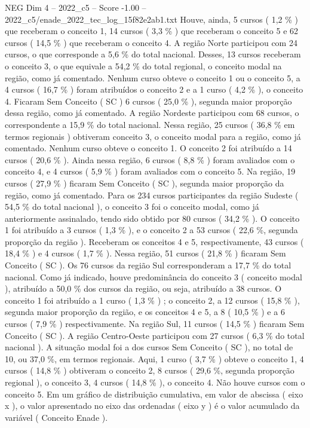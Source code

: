 \begin{textsample}{NEG Dim 4 – 2022\_c5 – Score -1.00 – 2022\_c5/enade\_2022\_tec\_log\_15f82e2ab1.txt}
Houve, ainda, 5 cursos ( 1,2 \% ) que receberam o conceito 1, 14 cursos ( 3,3 \% ) que receberam o conceito 5 e 62 cursos ( 14,5 \% ) que receberam o conceito 4.
A região Norte participou com 24 cursos, o que corresponde a 5,6 \% do total nacional.
Desses, 13 cursos receberam o conceito 3, o que equivale a 54,2 \% do total regional, o conceito modal na região, como já comentado.
Nenhum curso obteve o conceito 1 ou o conceito 5, a 4 cursos ( 16,7 \% ) foram atribuídos o conceito 2 e a 1 curso ( 4,2 \% ), o conceito 4.
Ficaram Sem Conceito ( SC ) 6 cursos ( 25,0 \% ), segunda maior proporção dessa região, como já comentado.
A região Nordeste participou com 68 cursos, o correspondente a 15,9 \% do total nacional.
Nessa região, 25 cursos ( 36,8 \% em termos regionais ) obtiveram conceito 3, o conceito modal para a região, como já comentado.
Nenhum curso obteve o conceito 1.
O conceito 2 foi atribuído a 14 cursos ( 20,6 \% ).
Ainda nessa região, 6 cursos ( 8,8 \% ) foram avaliados com o conceito 4, e 4 cursos ( 5,9 \% ) foram avaliados com o conceito 5.
Na região, 19 cursos ( 27,9 \% ) ficaram Sem Conceito ( SC ), segunda maior proporção da região, como já comentado.
Para os 234 cursos participantes da região Sudeste ( 54,5 \% do total nacional ), o conceito 3 foi o conceito modal, como já anteriormente assinalado, tendo sido obtido por 80 cursos ( 34,2 \% ).
O conceito 1 foi atribuído a 3 cursos ( 1,3 \% ), e o conceito 2 a 53 cursos ( 22,6 \%, segunda proporção da região ).
Receberam os conceitos 4 e 5, respectivamente, 43 cursos ( 18,4 \% ) e 4 cursos ( 1,7 \% ).
Nessa região, 51 cursos ( 21,8 \% ) ficaram Sem Conceito ( SC ).
Os 76 cursos da região Sul corresponderam a 17,7 \% do total nacional.
Como já indicado, houve predominância do conceito 3 ( conceito modal ), atribuído a 50,0 \% dos cursos da região, ou seja, atribuído a 38 cursos.
O conceito 1 foi atribuído a 1 curso ( 1,3 \% ) ; o conceito 2, a 12 cursos ( 15,8 \% ), segunda maior proporção da região, e os conceitos 4 e 5, a 8 ( 10,5 \% ) e a 6 cursos ( 7,9 \% ) respectivamente.
Na região Sul, 11 cursos ( 14,5 \% ) ficaram Sem Conceito ( SC ).
A região Centro-Oeste participou com 27 cursos ( 6,3 \% do total nacional ).
A situação modal foi a dos cursos Sem Conceito ( SC ), no total de 10, ou 37,0 \%, em termos regionais.
Aqui, 1 curso ( 3,7 \% ) obteve o conceito 1, 4 cursos ( 14,8 \% ) obtiveram o conceito 2, 8 cursos ( 29,6 \%, segunda proporção regional ), o conceito 3, 4 cursos ( 14,8 \% ), o conceito 4.
Não houve cursos com o conceito 5.
Em um gráfico de distribuição cumulativa, em valor de abscissa ( eixo x ), o valor apresentado no eixo das ordenadas ( eixo y ) é o valor acumulado da variável ( Conceito Enade ).

\end{textsample}

